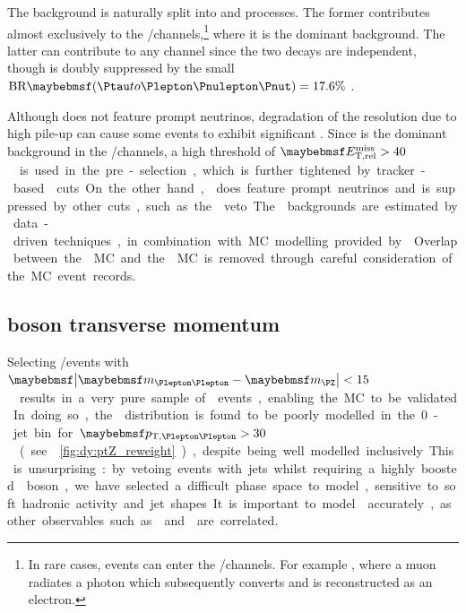 
The \DY background is naturally split into \DYll and \DYtt processes. The former 
contributes almost exclusively to the \eech/\mmch channels,\footnote{
	In rare cases, \DYll events can enter the \emch/\mech channels. For example 
	\HepProcess{\DY \HepTo \Pmu\Pmu\Pphoton}, where a muon radiates a photon which 
	subsequently converts and is reconstructed as an electron.
}
where it is the dominant background. The latter can contribute to any channel since the 
two \HepProcess{\Ptau \HepTo \Plepton\Pnulepton\Pnut} decays are independent, though is 
doubly suppressed by the small $\text{BR}\parenths{\HepProcess{\Ptau \HepTo 
\Plepton\Pnulepton\Pnut}} = 17.6\%$ \cite{PDG:2012}.

Although \DYll does not feature prompt neutrinos, degradation of the \met resolution due 
to high pile-up can cause some \DYll events to exhibit significant \met. Since \DYll is the 
dominant background in the \eech/\mmch channels, a high threshold of 
\unit{$\metrel > 40$}{\GeV} is used in the pre-selection, which is further tightened by 
tracker-based \trackmetrel cuts. On the other hand, \DYtt does feature prompt neutrinos and 
is suppressed by other cuts, such as the \mtautau veto.

The \DY backgrounds are estimated by data-driven techniques, in combination with MC 
modelling provided by \meps{\alpgen}{\fherwig}. Overlap between the \DY MC and the 
\Zgamma MC is removed through careful consideration of the MC event records.



\subsection{\DY boson transverse momentum}
\label{sec:dy:pt}

Selecting \eech/\mmch events with \unit{$\mods{\mll - \mZ} < 15$}{\GeV} results in a very 
pure sample of \DYll events, enabling the MC to be validated. In doing so, the \ptll 
distribution is found to be poorly modelled in the 0-jet bin for \unit{$\ptll > 30$}{\GeV} 
(see \Figure~\ref{fig:dy:ptZ_reweight}), despite being well modelled inclusively. 
This is unsurprising: by vetoing events with jets whilst requiring a highly boosted \DY 
boson, we have selected a difficult phase space to model, sensitive to soft hadronic 
activity and jet shapes. It is important to model \ptll accurately, as other observables 
such as \dphill and \ptleadlep are correlated.

